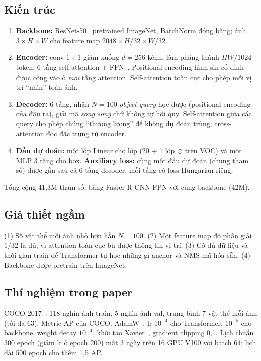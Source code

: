\documentclass[11pt, a4paper]{article}
\begin{document}
\subsection{Kiến trúc}
\begin{enumerate}
  \item \textbf{Backbone:} ResNet-50~\cite{he2016resnet} pretrained ImageNet, BatchNorm đóng băng; ảnh $3 \times H \times W$ cho feature map $2048 \times H/32 \times W/32$.
  \item \textbf{Encoder:} conv $1 \times 1$ giảm xuống $d = 256$ kênh, làm phẳng thành $HW/1024$ token; 6 tầng self-attention + FFN~\cite{vaswani2017attention}. Positional encoding hình sin cố định được cộng vào ở \emph{mọi} tầng attention. Self-attention toàn cục cho phép mỗi vị trí ``nhìn'' toàn ảnh.
  \item \textbf{Decoder:} 6 tầng, nhận $N = 100$ \emph{object query} học được (positional encoding của đầu ra), giải mã \emph{song song} chứ không tự hồi quy. Self-attention giữa các query cho phép chúng ``thương lượng'' để không dự đoán trùng; cross-attention đọc đặc trưng từ encoder.
  \item \textbf{Đầu dự đoán:} một lớp Linear cho lớp (20 + 1 lớp $\varnothing$ trên VOC) và một MLP 3 tầng cho box. \textbf{Auxiliary loss:} cùng một đầu dự đoán (chung tham số) được gắn sau cả 6 tầng decoder, mỗi tầng có loss Hungarian riêng.
\end{enumerate}
Tổng cộng 41,3M tham số, bằng Faster R-CNN-FPN với cùng backbone (42M).

\subsection{Giả thiết ngầm}
(1) Số vật thể mỗi ảnh nhỏ hơn hẳn $N = 100$. (2) Một feature map độ phân giải $1/32$ là đủ, vì attention toàn cục bù được thông tin vị trí. (3) Có đủ dữ liệu và thời gian train để Transformer tự học những gì anchor và NMS mã hóa sẵn. (4) Backbone được pretrain trên ImageNet.

\subsection{Thí nghiệm trong paper}
COCO 2017~\cite{lin2014coco}: 118 nghìn ảnh train, 5 nghìn ảnh val, trung bình 7 vật thể mỗi ảnh (tối đa 63). Metric AP của COCO. AdamW~\cite{loshchilov2019adamw}, lr $10^{-4}$ cho Transformer, $10^{-5}$ cho backbone, weight decay $10^{-4}$, khởi tạo Xavier~\cite{glorot2010xavier}, gradient clipping 0,1. Lịch chuẩn 300 epoch (giảm lr ở epoch 200) mất 3 ngày trên 16 GPU V100 với batch 64; lịch dài 500 epoch cho thêm 1,5 AP.
\end{document}
